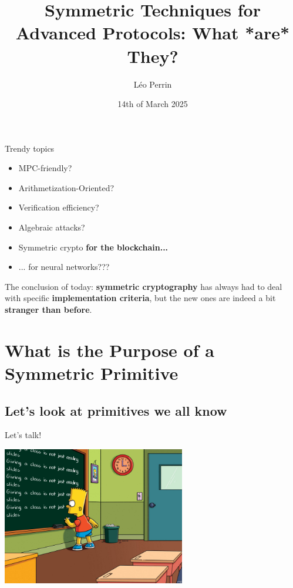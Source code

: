 \documentclass[presentation,aspectratio=1610]{beamer}
\title{Symmetric Techniques for Advanced Protocols: What *are* They?}
\author[Léo Perrin]{Léo Perrin\inst{1} }
\institute{Inria, Paris}
\date{14th of March 2025}
\begin{document}
{
  \pagestyle{empty}

  \maketitle


  \begin{frame}{Trendy topics}

    \begin{itemize}
      \large
    \item [] MPC-friendly? 
    \item [] Arithmetization-Oriented?
    \item [] Verification efficiency?
    \item [] Algebraic attacks? \pause
    \item [] Symmetric crypto \textbf{for the blockchain...} \pause
    \item [] \alert{... for neural networks???}
    \end{itemize}
    \begin{center}
      The conclusion of today: \textbf{symmetric cryptography} has always had to deal with specific \textbf{implementation criteria}, but the \alert{new ones} are indeed a bit \textbf{stranger than before}.
    \end{center}
  \end{frame}
}


\tocStartsAppearingHere{}


\section{What is the Purpose of a Symmetric Primitive}

\subsection{Let's look at primitives we all know}


\begin{frame}{Let's talk!}
  \vfill

  \begin{center}
    \includegraphics[width=8cm]{./figures/simpsons}
  \end{center}
  
  \vfill
\end{frame}
\end{document}

